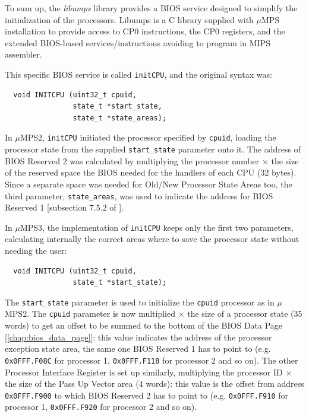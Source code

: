 \documentclass[12pt,a4paper,openright,twoside]{report}
\begin{document}
To sum up, the \textit{libumps} library provides a BIOS service designed to simplify the initialization of the processors.
Libumps is a C library supplied with $\mu$MPS installation to provide access to CP0 instructions, the CP0 registers, and the extended BIOS-based services/instructions avoiding to program in MIPS assembler.

This specific BIOS service is called \texttt{initCPU}, and the original syntax was:
\begin{verbatim}
  void INITCPU (uint32_t cpuid,
                state_t *start_state,
                state_t *state_areas);
\end{verbatim}

In $\mu$MPS2, \texttt{initCPU} initiated the processor specified by \texttt{cpuid}, loading the processor state from the supplied \texttt{start\_state} parameter onto it.
The address of BIOS Reserved 2 was calculated by multiplying the processor number $\times$ the size of the reserved space the BIOS needed for the handlers of each CPU (32 bytes).
Since a separate space was needed for Old/New Processor State Areas too, the third parameter, \texttt{state\_areas}, was used to indicate the address for BIOS Reserved 1 [subsection 7.5.2 of \cite{old_pops}].

In $\mu$MPS3, the implementation of \texttt{initCPU} keeps only the first two parameters, calculating internally the correct areas where to save the processor state without needing the user:
\begin{verbatim}
  void INITCPU (uint32_t cpuid,
                state_t *start_state);
\end{verbatim}

The \texttt{start\_state} parameter is used to initialize the \texttt{cpuid} processor as in $\mu$MPS2.
The \texttt{cpuid} parameter is now multiplied $\times$ the size of a processor state (35 words) to get an offset to be summed to the bottom of the BIOS Data Page [\autoref{chap:bios_data_page}]: this value indicates the address of the processor exception state area, the same one BIOS Reserved 1 has to point to (e.g. \texttt{0x0FFF.F08C} for processor 1, \texttt{0x0FFF.F118} for processor 2 and so on).
The other Processor Interface Register is set up similarly, multiplying the processor ID $\times$ the size of the Pass Up Vector area (4 words): this value is the offset from address \texttt{0x0FFF.F900} to which BIOS Reserved 2 has to point to (e.g. \texttt{0x0FFF.F910} for processor 1, \texttt{0x0FFF.F920} for processor 2 and so on).
\end{document}
